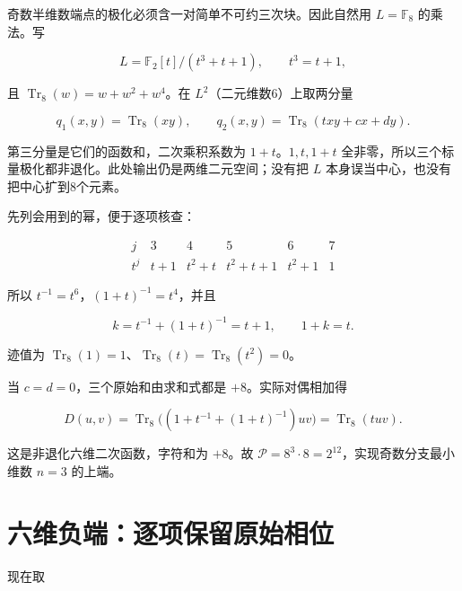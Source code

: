 \documentclass[UTF8,fontset=fandol,zihao=-4,openany,oneside]{ctexbook}
\begin{document}
奇数半维数端点的极化必须含一对简单不可约三次块。因此自然用 \(L=\mathbb F_8\) 的乘法。写



\[
L=\mathbb F_2[t]/(t^3+t+1),\qquad t^3=t+1,
\]



且 \(\operatorname{Tr}_8(w)=w+w^2+w^4\)。在 \(L^2\)（二元维数6）上取两分量



\[
q_1(x,y)=\operatorname{Tr}_8(xy),\qquad
q_2(x,y)=\operatorname{Tr}_8(txy+cx+dy).
\]



第三分量是它们的函数和，二次乘积系数为 \(1+t\)。\(1,t,1+t\) 全非零，所以三个标量极化都非退化。此处输出仍是两维二元空间；没有把 \(L\) 本身误当中心，也没有把中心扩到8个元素。



先列会用到的幂，便于逐项核查：



\[
\begin{array}{c|ccccc}
j&3&4&5&6&7\\\hline
t^j&t+1&t^2+t&t^2+t+1&t^2+1&1
\end{array}
\]



所以 \(t^{-1}=t^6\)，\((1+t)^{-1}=t^4\)，并且



\[
k=t^{-1}+(1+t)^{-1}=t+1,\qquad 1+k=t.
\]



迹值为 \(\operatorname{Tr}_8(1)=1\)、\(\operatorname{Tr}_8(t)=\operatorname{Tr}_8(t^2)=0\)。



当 \(c=d=0\)，三个原始和由求和式都是 \(+8\)。实际对偶相加得



\[
D(u,v)=\operatorname{Tr}_8\bigl((1+t^{-1}+(1+t)^{-1})uv\bigr)=\operatorname{Tr}_8(tuv).
\]



这是非退化六维二次函数，字符和为 \(+8\)。故 \(\mathcal P=8^3\cdot8=2^{12}\)，实现奇数分支最小维数 \(n=3\) 的上端。



\section{六维负端：逐项保留原始相位}


现在取
\end{document}
